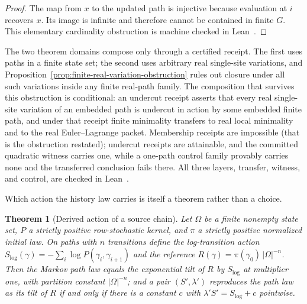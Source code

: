 \documentclass[11pt]{article}
\newcounter{none}
\newtheorem{theorem}{Theorem}[section]
\begin{document}
\begin{proof}
The map from \(x\) to the updated path is injective because evaluation at
\(i\) recovers \(x\).  Its image is infinite and therefore cannot be contained
in finite \(G\).  This elementary cardinality obstruction is machine checked
in Lean~\cite{ophrepo}.
\end{proof}

The two theorem domains compose only through a certified receipt.  The first
uses paths in a finite state set; the second uses arbitrary real single-site
variations, and Proposition~\ref{prop:finite-real-variation-obstruction}
rules out closure under all such variations inside any finite real-path
family.  The composition that survives this obstruction is conditional: an
undercut receipt asserts that every real single-site variation of an
embedded path is undercut in action by some embedded finite path, and under
that receipt finite minimality transfers to real local minimality and to the
real Euler--Lagrange packet.  Membership receipts are impossible (that is the
obstruction restated); undercut receipts are attainable, and the committed
quadratic witness carries one, while a one-path control family provably
carries none and the transferred conclusion fails there.  All three layers,
transfer, witness, and control, are checked in Lean~\cite{ophrepo}.

Which action the history law carries is itself a theorem rather than a
choice.

\begin{theorem}[Derived action of a source chain]
\label{thm:derived-action}
Let \(\Omega\) be a finite nonempty state set, \(P\) a strictly positive
row-stochastic kernel, and \(\pi\) a strictly positive normalized initial
law.  On paths with
\(n\) transitions define the log-transition action
\(S_{\log}(\gamma)=-\sum_{i}\log P(\gamma_i,\gamma_{i+1})\) and the reference
\(R(\gamma)=\pi(\gamma_0)\,|\Omega|^{-n}\).  Then the Markov path law equals
the exponential tilt of \(R\) by \(S_{\log}\) at multiplier one, with
partition constant \(|\Omega|^{-n}\); and a pair \((S',\lambda')\) reproduces
the path law as its tilt of \(R\) if and only if there is a constant \(c\)
with \(\lambda'S'=S_{\log}+c\) pointwise.
\end{theorem}
\end{document}
